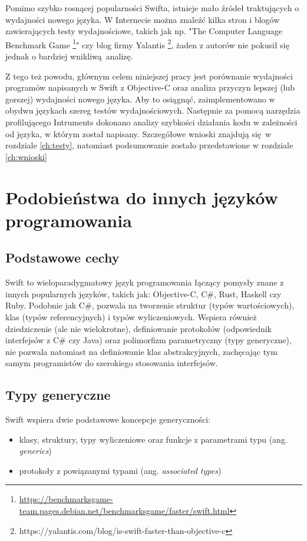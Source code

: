 \documentclass[mgr, shortabstract]{iithesis}
\begin{document}
Pomimo szybko rosnącej popularności Swifta, istnieje mało źródeł traktujących o wydajności nowego języka. W Internecie można znaleźć kilka stron i blogów zawierających testy wydajnościowe, takich jak np. "The Computer Language Benchmark Game \footnote{\url{https://benchmarksgame-team.pages.debian.net/benchmarksgame/faster/swift.html}}" czy blog firmy Yalantis \footnote{https://yalantis.com/blog/is-swift-faster-than-objective-c}, żaden z autorów nie pokusił się jednak o bardziej wnikliwą analizę. 

Z tego też powodu, głównym celem niniejszej pracy jest porównanie wydajności programów napisanych w Swift z Objective-C oraz analiza przyczyn lepszej (lub gorszej) wydajności nowego języka. Aby to osiągnąć, zaimplementowano w obydwu językach szereg testów wydajnościowych. Następnie za pomocą narzędzia profilującego Intruments dokonano analizy szybkości działania kodu w zależności od języka, w którym został napisany. Szczegółowe wnioski znajdują się w rozdziale \ref{ch:testy}, natomiast podsumowanie zostało przedstawione w rozdziale \ref{ch:wnioski}

\chapter{Podobieństwa do innych języków programowania}
\label{ch:podobienstwa_do_innych}

\section{Podstawowe cechy}
\label{s:podstawowe_cechy}

Swift to wieloparadygmatowy język programowania łączący pomysły znane z innych popularnych języków, takich jak: Objective-C, C\#, Rust, Haskell czy Ruby. Podobnie jak C\#, pozwala na tworzenie struktur (typów wartościowych), klas (typów referencyjnych) i typów wyliczeniowych. Wspiera również dziedziczenie (ale nie wielokrotne), definiowanie protokołów (odpowiednik interfejsów z C\# czy Java) oraz polimorfizm parametryczny (typy generyczne), nie pozwala natomiast na definiowanie klas abstrakcyjnych, zachęcając tym samym programistów do szerokiego stosowania interfejsów.

\section{Typy generyczne}
\label{s:typy_generyczne}

Swift wspiera dwie podstawowe koncepcje generyczności:
\begin{itemize}
  \item klasy, struktury, typy wyliczeniowe oraz funkcje z parametrami typu (ang. \textit{generics})
  \item protokoły z powiązanymi typami (ang. \textit{associated types})
\end{itemize}
\end{document}
